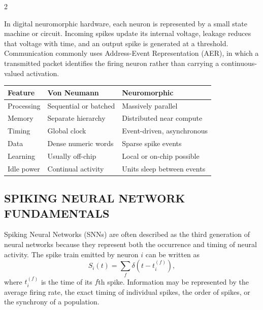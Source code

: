 \begin{multicols}{2}
  \begin{center}
\begin{minipage}{0.98\columnwidth}
\centering
    \arjunNeuronFigure
\end{minipage}
  \end{center}

  In digital neuromorphic hardware, each neuron is represented by a small state machine or circuit. Incoming spikes update its internal voltage, leakage reduces that voltage with time, and an output spike is generated at a threshold. Communication commonly uses Address-Event Representation (AER), in which a transmitted packet identifies the firing neuron rather than carrying a continuous-valued activation.

  \begin{center}
\begin{minipage}{0.98\columnwidth}
\centering
    \scriptsize
    \setlength{\tabcolsep}{3pt}
    \renewcommand{\arraystretch}{1.25}
    \begin{tabular}{@{}>{\RaggedRight\arraybackslash}p{}
      >{\RaggedRight\arraybackslash}p{}
      >{\RaggedRight\arraybackslash}p{}@{}}
      \toprule
      \textbf{Feature} & \textbf{Von Neumann} & \textbf{Neuromorphic} \\
      \midrule
      Processing & Sequential or batched & Massively parallel \\
      Memory & Separate hierarchy & Distributed near compute \\
      Timing & Global clock & Event-driven, asynchronous \\
      Data & Dense numeric words & Sparse spike events \\
      Learning & Usually off-chip & Local or on-chip possible \\
      Idle power & Continual activity & Units sleep between events \\
      \bottomrule
    \end{tabular}
\end{minipage}
  \end{center}

  \subsection*{\centering\uppercase{Spiking Neural Network Fundamentals}}
  Spiking Neural Networks (SNNs) are often described as the third generation of neural networks because they represent both the occurrence and timing of neural activity. The spike train emitted by neuron $i$ can be written as
  \[
    S_i(t)=\sum_f \delta\!\left(t-t_i^{(f)}\right),
  \]
  where $t_i^{(f)}$ is the time of its $f$th spike. Information may be represented by the average firing rate, the exact timing of individual spikes, the order of spikes, or the synchrony of a population.


\end{multicols}
